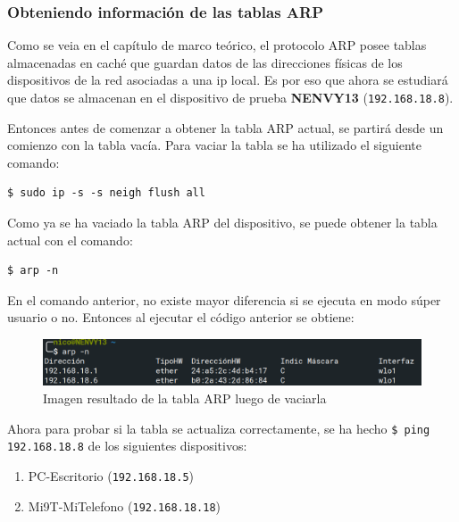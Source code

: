 \subsubsection{Obteniendo información de las tablas ARP}

\noindent Como se veia en el capítulo de marco teórico, el protocolo ARP posee tablas almacenadas en caché que guardan datos de las direcciones físicas de los dispositivos de la red asociadas a una ip local. Es por eso que ahora se estudiará que datos se almacenan en el dispositivo de prueba \textbf{NENVY13} (\verb|192.168.18.8|).
\newline

\noindent Entonces antes de comenzar a obtener la tabla ARP actual, se partirá desde un comienzo con la tabla vacía. Para vaciar la tabla se ha utilizado el siguiente comando: 

 \begin{lstlisting}
$ sudo ip -s -s neigh flush all
\end{lstlisting}

\noindent Como ya se ha vaciado la tabla ARP del dispositivo, se puede obtener la tabla actual con el comando:

 \begin{lstlisting}
$ arp -n
\end{lstlisting}
 
 \noindent En el comando anterior, no existe mayor diferencia si se ejecuta en modo súper usuario o no. Entonces al ejecutar el código anterior se obtiene:
 
 \begin{figure}[!ht]
	\centering
	\includegraphics[scale=0.4]{images/arp_1.png}
	\caption{Imagen resultado de la tabla ARP luego de vaciarla}
	\label{fig:arp1}
\end{figure}
 
 \noindent Ahora para probar si la tabla se actualiza correctamente, se ha hecho \verb|$ ping 192.168.18.8| de los siguientes dispositivos:
 
 \begin{enumerate}
     \item PC-Escritorio (\verb|192.168.18.5|)
     \item Mi9T-MiTelefono (\verb|192.168.18.18|)
 \end{enumerate}
 

